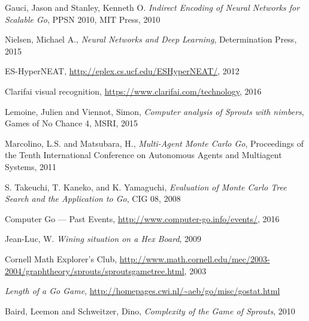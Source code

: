 \begin{thebibliography}{99}
 Gauci, Jason and Stanley, Kenneth O. \emph{Indirect Encoding of Neural Networks for Scalable Go}, PPSN 2010, MIT Press, 2010

 Nielsen, Michael A., \emph{Neural Networks and Deep Learning}, Determination Press, 2015

 ES-HyperNEAT, \url{http://eplex.cs.ucf.edu/ESHyperNEAT/}, 2012

 Clarifai visual recognition, \url{https://www.clarifai.com/technology}, 2016

 Lemoine, Julien and Viennot, Simon, \emph{Computer analysis of Sprouts with nimbers}, Games of No Chance 4, MSRI, 2015

 Marcolino, L.S. and Matsubara, H., \emph{Multi-Agent Monte Carlo Go},  Proceedings of the Tenth International Conference on Autonomous Agents and Multiagent Systems, 2011

 S. Takeuchi, T. Kaneko, and K. Yamaguchi, \emph{Evaluation of Monte Carlo Tree Search and the Application to Go}, CIG 08, 2008

 Computer Go --- Past Events, \url{http://www.computer-go.info/events/}, 2016

 Jean-Luc, W. \emph{Wining situation on a Hex Board}, 2009

 Cornell Math Explorer's Club, \url{http://www.math.cornell.edu/mec/2003-2004/graphtheory/sprouts/sproutsgametree.html}, 2003

 \emph{Length of a Go Game}, \url{http://homepages.cwi.nl/~aeb/go/misc/gostat.html}

 Baird, Leemon and Schweitzer, Dino, \emph{Complexity of the Game of Sprouts}, 2010

\end{thebibliography}